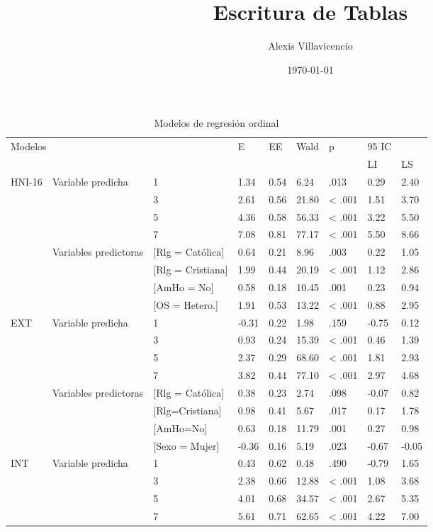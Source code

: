 \documentclass[a4paper,12pt]{article}
\title{Escritura de Tablas}
\author{Alexis Villavicencio}
\date{\today}
\begin{document}
 \maketitle
\begin{table}
\label{tabla:03}
\caption{Modelos de regresión ordinal}
\begin{tabular}{lllllllll}
\hline 
\multicolumn{3}{l}{\multirow{2}{*}{Modelos}} & \multirow{2}{*}{E} &\multirow{2}{*}{EE} & \multirow{2}{*}{Wald}& \multirow{2}{*}{p} & 95 IC\\ \cline{8-9}
& & & & & & & LI & LS \\ \hline
\multirow{8}{*}{HNI-16}&\multirow{4}{*}{Variable predicha}&1& 1.34& 0.54& 6.24& .013& 0.29& 2.40\\
&& 3& 2.61& 0.56& 21.80& < .001& 1.51& 3.70\\
&& 5& 4.36& 0.58 &56.33& < .001& 3.22 &5.50\\
&& 7& 7.08& 0.81& 77.17& < .001& 5.50& 8.66\\
& \multirow{4}{*}{Variables predictoras}&[Rlg = Católica]& 0.64& 0.21& 8.96& .003& 0.22& 1.05\\
&&[Rlg = Cristiana]& 1.99& 0.44& 20.19& < .001& 1.12& 2.86\\
&&[AmHo = No]& 0.58& 0.18& 10.45& .001& 0.23& 0.94\\
&&[OS = Hetero.]& 1.91& 0.53& 13.22& < .001& 0.88& 2.95\\
\multirow{8}{*}{EXT}&\multirow{4}{*}{Variable predicha}& 1& -0.31& 0.22& 1.98& .159& -0.75& 0.12\\
&&3& 0.93& 0.24& 15.39& < .001& 0.46& 1.39\\
&&5& 2.37& 0.29& 68.60& < .001& 1.81& 2.93\\
&&7& 3.82& 0.44& 77.10& < .001& 2.97& 4.68\\
& \multirow{4}{*}{Variables predictoras}& [Rlg = Católica]& 0.38& 0.23& 2.74& .098& -0.07& 0.82\\
&&[Rlg=Cristiana]& 0.98& 0.41& 5.67& .017& 0.17& 1.78\\
&&[AmHo=No]& 0.63& 0.18& 11.79& .001& 0.27& 0.98\\
&&[Sexo = Mujer]& -0.36& 0.16& 5.19& .023& -0.67& -0.05\\
\multirow{7}{*}{INT}&\multirow{4}{*}{Variable predicha}& 1& 0.43& 0.62& 0.48& .490& -0.79& 1.65\\
&&3& 2.38& 0.66& 12.88& < .001& 1.08& 3.68\\
&&5& 4.01& 0.68& 34.57& < .001& 2.67& 5.35\\
&&7& 5.61& 0.71& 62.65& < .001& 4.22& 7.00\\

\end{tabular}
\end{table}
\end{document}
